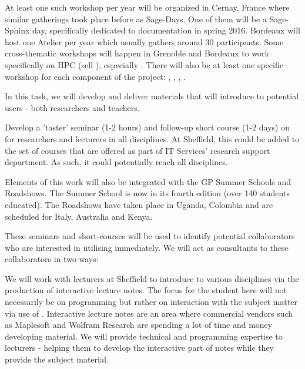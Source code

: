 \begin{workpackage}[id=dissem,wphases=18-48!.5,
  title=Dissemination and Community Building,
  lead=PS,
  PSRM=10, %
  SARM=18,
  USORM=10,
  USHRM=8,
  USRM=24,
  UVRM=2,
  UBRM=4,
]
\begin{tasklist}
\begin{task}[title=Organization of development workshops]
At least one such workshop per year will be organized in Cernay, France where similar gatherings took place before as Sage-Days. One of them will be a Sage-Sphinx day, specifically dedicated to documentation in spring 2016. Bordeaux will host one Atelier \Pari per year which usually gathers around 30 participants. Some cross-thematic workshops will happen in Grenoble and Bordeaux to work specifically on HPC (sell ), especially . There will also be at least one specific workshop for each component of the project: \Singular, \SMC, \IPython, \Jupyter.


\end{task}

\begin{task}[title=Introduce \TheProject to researchers and teachers]
In this task, we will develop and deliver materials that will introduce \TheProject to potential users - both researchers and teachers.

Develop a 'taster' seminar (1-2 hours) and follow-up short course (1-2 days) on \TheProject for researchers and lecturers in all disciplines. At Sheffield, this could be added to the set of courses that are offered as part of IT Services' research support department. As such, it could potentially reach all disciplines.

Elements of this work will also be integrated with the GP Summer Schools and Roadshows. The Summer School is now in its fourth edition (over 140 students educated). The Roadshows have taken place in Uganda, Colombia and are scheduled for Italy, Australia and Kenya.

These seminars and short-courses will be used to identify potential collaborators who are interested in utilising \TheProject immediately. We will act as consultants to these collaborators in two ways:

We will work with lecturers at Sheffield to introduce \TheProject to various disciplines via the production of interactive lecture notes. The focus for the student here will not necessarily be on programming but rather on interaction with the subject matter via use of \TheProject. Interactive lecture notes are an area where commercial vendors such as Maplesoft and Wolfram Research are spending a lot of time and money developing material. We will provide technical and programming expertise to lecturers - helping them to develop the interactive part of notes while they provide the subject material.


\end{task}
\end{tasklist}
\end{workpackage}

